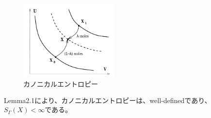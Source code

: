 \documentclass[a4paper,11pt]{jsarticle}
\begin{document}
\begin{figure}[H]
    \begin{center}
    \includegraphics[width=50mm]{fig2.png}
    \end{center}
    \caption{カノニカルエントロピー}
    \label{fig:one}
\end{figure}
Lemma2.1により、カノニカルエントロピーは、well-definedであり、$S_{\Gamma}(X)<\infty$である。\\
\end{document}
